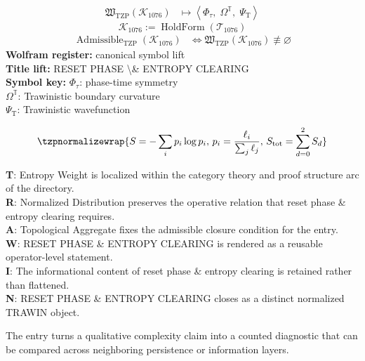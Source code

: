 \noindent
\begin{minipage}[t]{0.48\linewidth}
\begingroup
\small
\[
\begin{aligned}
\mathfrak{W}_{\mathrm{TZP}}\!\left(\mathcal{K}_{1076}\right)
&\longmapsto
\left\langle \Phi_{\tau},\; \Omega^{\mathbb{T}},\; \Psi_{\mathrm{T}} \right\rangle
\end{aligned}
\]
\[
\mathcal{K}_{1076}
:=
\operatorname{HoldForm}\!\left(\mathcal{T}_{1076}\right)
\]
\[
\begin{aligned}
\operatorname{Admissible}_{\mathrm{TZP}}\!\left(\mathcal{K}_{1076}\right)
&\Longleftrightarrow
\mathfrak{W}_{\mathrm{TZP}}\!\left(\mathcal{K}_{1076}\right)\not\equiv\varnothing
\end{aligned}
\]
\textbf{Wolfram register:} canonical symbol lift\\
\textbf{Title lift:} RESET PHASE \textbackslash{}\& ENTROPY CLEARING\\
\textbf{Symbol key:} \(\Phi_{\tau}\): phase-time symmetry\\ \(\Omega^{\mathbb{T}}\): Trawinistic boundary curvature\\ \(\Psi_{\mathrm{T}}\): Trawinistic wavefunction
\par
\endgroup
\end{minipage}\hfill
\begin{minipage}[t]{0.48\linewidth}
\[
\tzpnormalizewrap{S = -\sum_i p_i \log p_i,\,p_i = \frac{\ell_i}{\sum_j \ell_j},\,S_{\mathrm{tot}} = \sum_{d=0}^{2} S_d}
\]

\small
\textbf{T}: Entropy Weight is localized within the category theory and proof structure arc of the directory.\\
\textbf{R}: Normalized Distribution preserves the operative relation that reset phase \& entropy clearing requires.\\
\textbf{A}: Topological Aggregate fixes the admissible closure condition for the entry.\\
\textbf{W}: RESET PHASE \& ENTROPY CLEARING is rendered as a reusable operator-level statement.\\
\textbf{I}: The informational content of reset phase \& entropy clearing is retained rather than flattened.\\
\textbf{N}: RESET PHASE \& ENTROPY CLEARING closes as a distinct normalized TRAWIN object.
\normalsize
\end{minipage}

The entry turns a qualitative complexity claim into a counted diagnostic that can be compared across neighboring persistence or information layers.
\clearpage

